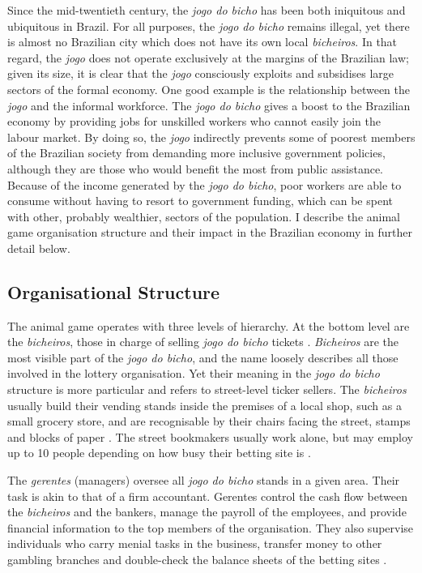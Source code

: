 \documentclass[a4paper,12pt]{article}
\begin{document}
Since the mid-twentieth century, the \textit{jogo do bicho} has been both iniquitous and ubiquitous in Brazil. For all purposes, the \textit{jogo do bicho} remains illegal, yet there is almost no Brazilian city which does not have its own local \textit{bicheiros}. In that regard, the \textit{jogo} does not operate exclusively at the margins of the Brazilian law; given its size, it is clear that the \textit{jogo} consciously exploits and subsidises large sectors of the formal economy. One good example is the relationship between the \textit{jogo} and the informal workforce. The \textit{jogo do bicho} gives a boost to the Brazilian economy by providing jobs for unskilled workers who cannot easily join the labour market. By doing so, the \textit{jogo} indirectly prevents some of poorest members of the Brazilian society from demanding more inclusive government policies, although they are those who would benefit the most from public assistance. Because of the income generated by the \textit{jogo do bicho}, poor workers are able to consume without having to resort to government funding, which can be spent with other, probably wealthier, sectors of the population. I describe the animal game organisation structure and their impact in the Brazilian economy in further detail below.  

\subsection{Organisational Structure}
\label{sub:organisation}

The animal game operates with three levels of hierarchy. At the bottom level are the \textit{bicheiros}, those in charge of selling \textit{jogo do bicho} tickets \citep{chazkel2007beyond, da1999aguias}. \textit{Bicheiros} are the most visible part of the \textit{jogo do bicho}, and the name loosely describes all those involved in the lottery organisation. Yet their meaning in the \textit{jogo do bicho} structure is more particular and refers to street-level ticker sellers. The \textit{bicheiros}  usually build their vending stands inside the premises of a local shop, such as a small grocery store, and are recognisable by their chairs facing the street, stamps and blocks of paper \citep[259]{chazkel2011laws}. The street bookmakers usually work alone, but may employ up to 10 people depending on how busy their betting site is \citep[69]{labronici2014sorteio}.

The \textit{gerentes} (managers) oversee all \textit{jogo do bicho} stands in a given area. Their task is akin to that of a firm accountant. Gerentes control the cash flow between the \textit{bicheiros} and the bankers, manage the payroll of the employees, and provide financial information to the top members of the organisation. They also supervise individuals who carry menial tasks in the business, transfer money to other gambling branches and double-check the balance sheets of the betting sites \citetext{\citealp[71]{labronici2012paratodos}; \citealp[142]{misse2007illegal}}.
\end{document}
